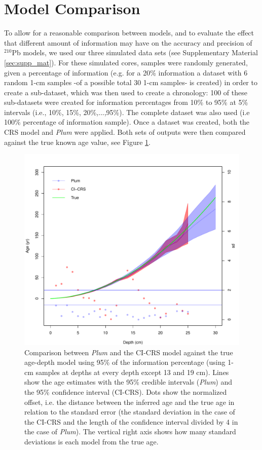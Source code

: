 \documentclass [10pt] {article}
\begin{document}
\section{Model Comparison}

To allow for a reasonable comparison between models, and to evaluate the effect that different amount of information may have on the accuracy and precision of $^{210}$Pb models, we used our three simulated data sets (see Supplementary Material \ref{sec:supp_mat}). 
For these simulated cores, samples were randomly generated, given a percentage of information (e.g. for a 20\% information a dataset with 6 random 1-cm samples -of a possible total 30 1-cm samples- is created) in order to create a sub-dataset, which was then used to create a chronology:
100 of these sub-datasets were created for information percentages from 10\% to 95\% at 5\% intervals (i.e., 10\%, 15\%, 20\%,...,95\%). 
The complete dataset was also used (i.e 100\% percentage of information sample).
Once a dataset was created, both the CRS model and \textit{Plum} were applied.  
Both sets of outputs were then compared against the true known age value, see Figure \ref{fig:comparison1r}.

\begin{figure}[!]
	\centering
	\includegraphics[width=\linewidth]{comparison1.pdf}
		\caption{Comparison between \textit{Plum} and the CI-CRS model against the true age-depth model using 95\% of the information percentage (using 1-cm samples at depths at every depth except 13 and 19 cm). Lines show the age estimates with the 95\% credible intervals (\textit{Plum}) and the 95\% confidence interval (CI-CRS). Dots show the normalized offset, i.e. the distance between the inferred age and the true age in relation to the standard error (the standard deviation in the case of the CI-CRS and the length of the confidence interval divided by 4 in the case of \textit{Plum}). The vertical right axis shows how many standard deviations is each model from the true age.  }
		\label{fig:comparison1r}
\end{figure}
\end{document}
